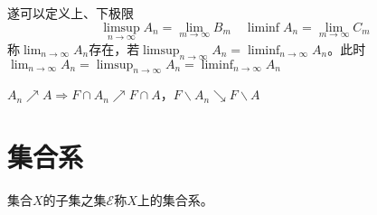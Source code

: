 \documentclass{ctexart}
\begin{document}
遂可以定义上、下极限
\[\limsup_{n\to\infty} A_{n}=\lim_{m\to\infty}B_{m}\quad \liminf A_{n}=\lim_{m\to\infty}C_{m}\]称$\lim_{n\to\infty}A_{n}$存在，若$\limsup_{n\to\infty}A_{n}=\liminf_{n\to\infty}A_{n}$。此时$\lim_{n\to\infty}A_{n}=\limsup_{n\to\infty}A_{n}=\liminf_{n\to\infty}A_{n}$

\begin{Prop}
  $A_{n}\nearrow A\Rightarrow F\cap A_{n}\nearrow F\cap A$，$F\backslash A_{n}\searrow F\backslash A$
\end{Prop}

\section{集合系}
\begin{Def}
集合$X$的子集之集$\mathcal{E}$称$X$上的集合系。
\end{Def}
\end{document}
